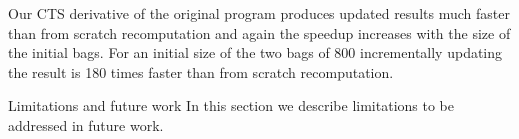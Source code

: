 Our CTS derivative of the original program produces updated results much faster
than from scratch recomputation and again the speedup increases with the size
of the initial bags. For an initial size of the two bags of \ensuremath{\mathrm{800}}
incrementally updating the result is 180 times faster than from scratch
recomputation.


\iftoggle{poplForThesis}{\section}{\subsection}{Limitations and future work}
\iftoggle{poplForThesis}{\let \limSection = \subsection}{\let \limSection = \subsubsection}
\label{sec:cts-limitations}
In this section we describe limitations to be addressed in future work.






